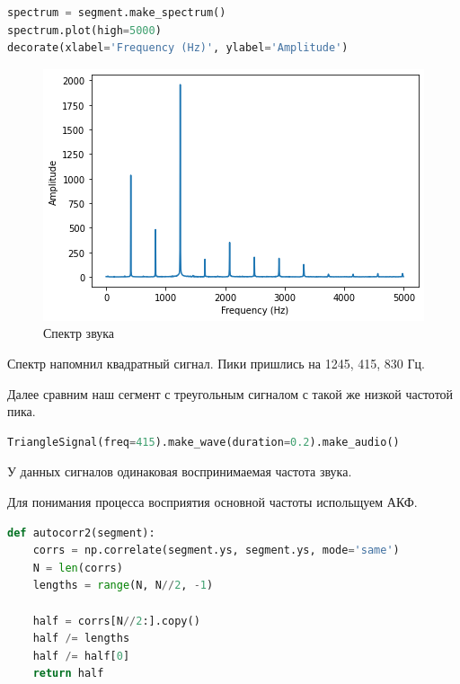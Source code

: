 \begin{lstlisting}[language=Python]
spectrum = segment.make_spectrum()
spectrum.plot(high=5000)
decorate(xlabel='Frequency (Hz)', ylabel='Amplitude')
\end{lstlisting}
\begin{figure}[H]
	\begin{center}
		\includegraphics[scale=1]{fig/lab05/lab05_37_0.png}
		\caption{Спектр звука}
	\end{center}
\end{figure}

Спектр напомнил квадратный сигнал. Пики пришлись на 1245, 415, 830 Гц.

Далее сравним наш сегмент с треугольным сигналом с такой же низкой частотой пика.

\begin{lstlisting}[language=Python]
TriangleSignal(freq=415).make_wave(duration=0.2).make_audio()
\end{lstlisting}

У данных сигналов одинаковая воспринимаемая частота звука.

Для понимания процесса восприятия основной частоты испольщуем АКФ.

\begin{lstlisting}[language=Python]
def autocorr2(segment):
    corrs = np.correlate(segment.ys, segment.ys, mode='same')
    N = len(corrs)
    lengths = range(N, N//2, -1)

    half = corrs[N//2:].copy()
    half /= lengths
    half /= half[0]
    return half
\end{lstlisting}

